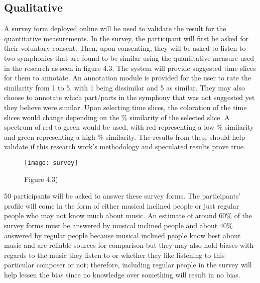 \subsection{Qualitative}

A survey form deployed online will be used to validate the result for the quantitative measurements. In the survey, the participant will first be asked for their voluntary consent. Then, upon consenting, they will be asked to listen to two symphonies that are found to be similar using the quantitative measure used in the research as seen in figure 4.3. The system will provide suggested time slices for them to annotate. An annotation module is provided for the user to rate the similarity from 1 to 5, with 1 being dissimilar and 5 as similar. They may also choose to annotate which part/parts in the symphony that was not suggested yet they believe were similar. Upon selecting time slices, the coloration of the time slices would change depending on the \% similarity of the selected slice. A spectrum of red to green would be used, with red representing a low \% similarity and green representing a high \% similarity. The results from these should help validate if this research work’s methodology and speculated results prove true.

\begin{figure}[h]
\caption{Figure 4.3)}
\centering
\texttt{[image: survey]}
\end{figure}

50 participants will be asked to answer these survey forms. The participants’ profile will come in the form of either musical inclined people or just regular people who may not know much about music. An estimate of around 60\% of the survey forms must be answered by musical inclined people and about 40\% answered by regular people because musical inclined people know best about music and are reliable sources for comparison but they may also hold biases with regards to the music they listen to or whether they like listening to this particular composer or not; therefore, including regular people in the survey will help lessen the bias since no knowledge over something will result in no bias. 